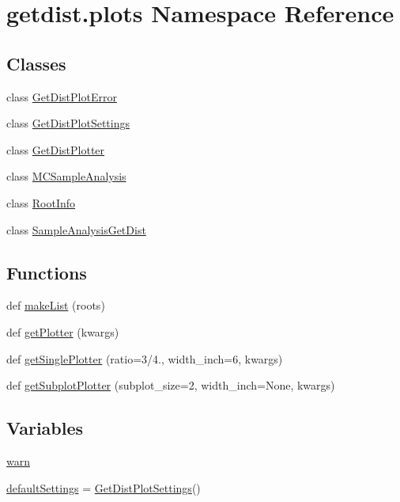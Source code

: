 \hypertarget{namespacegetdist_1_1plots}{}\section{getdist.\+plots Namespace Reference}
\label{namespacegetdist_1_1plots}
\subsection*{Classes}
\begin{DoxyCompactItemize}
\item 
class \mbox{\hyperlink{classgetdist_1_1plots_1_1GetDistPlotError}{Get\+Dist\+Plot\+Error}}
\item 
class \mbox{\hyperlink{classgetdist_1_1plots_1_1GetDistPlotSettings}{Get\+Dist\+Plot\+Settings}}
\item 
class \mbox{\hyperlink{classgetdist_1_1plots_1_1GetDistPlotter}{Get\+Dist\+Plotter}}
\item 
class \mbox{\hyperlink{classgetdist_1_1plots_1_1MCSampleAnalysis}{M\+C\+Sample\+Analysis}}
\item 
class \mbox{\hyperlink{classgetdist_1_1plots_1_1RootInfo}{Root\+Info}}
\item 
class \mbox{\hyperlink{classgetdist_1_1plots_1_1SampleAnalysisGetDist}{Sample\+Analysis\+Get\+Dist}}
\end{DoxyCompactItemize}
\subsection*{Functions}
\begin{DoxyCompactItemize}
\item 
def \mbox{\hyperlink{namespacegetdist_1_1plots_a4baafa26a8f5db6c9860985644f8fefe}{make\+List}} (roots)
\item 
def \mbox{\hyperlink{namespacegetdist_1_1plots_acebf6c49d9990fc724f3a726f2b1b8f9}{get\+Plotter}} (kwargs)
\item 
def \mbox{\hyperlink{namespacegetdist_1_1plots_a3b4916897da068a5f8018c216b631fcf}{get\+Single\+Plotter}} (ratio=3/4., width\+\_\+inch=6, kwargs)
\item 
def \mbox{\hyperlink{namespacegetdist_1_1plots_a97e7cbfb3b0571b6c44b8313f8b6cdc9}{get\+Subplot\+Plotter}} (subplot\+\_\+size=2, width\+\_\+inch=None, kwargs)
\end{DoxyCompactItemize}
\subsection*{Variables}
\begin{DoxyCompactItemize}
\item 
\mbox{\hyperlink{namespacegetdist_1_1plots_a4806396b6b1ef165505f39ea2a8846b0}{warn}}
\item 
\mbox{\hyperlink{namespacegetdist_1_1plots_a39c9b9a44ac4dde2f52838515ee8cbe5}{default\+Settings}} = \mbox{\hyperlink{classgetdist_1_1plots_1_1GetDistPlotSettings}{Get\+Dist\+Plot\+Settings}}()
\end{DoxyCompactItemize}


